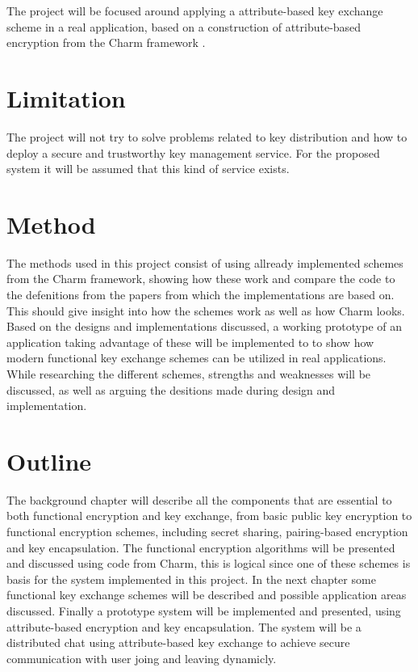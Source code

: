 The project will be focused around applying a attribute-based key exchange scheme in a real application, based on a construction of attribute-based encryption from the Charm framework \cite{DBLP:Charm13}.


\section{Limitation}\label{sec:limitations}
The project will not try to solve problems related to key distribution and how to deploy a secure and trustworthy key management service. For the proposed system it will be assumed that this kind of service exists.

\section{Method}
The methods used in this project consist of using allready implemented schemes from the Charm framework, showing how these work and compare the code to the defenitions from the papers from which the implementations are based on. This should give insight into how the schemes work as well as how Charm looks. Based on the designs and implementations discussed, a working prototype of an application taking advantage of these will be implemented to to show how modern functional key exchange schemes can be utilized in real applications. While researching the different schemes, strengths and weaknesses will be discussed, as well as arguing the desitions made during design and implementation.


\section{Outline}\label{sec:outline}
The background chapter will describe all the components that are essential to both functional encryption and key exchange, from basic public key encryption to functional encryption schemes, including secret sharing, pairing-based encryption and key encapsulation. The functional encryption algorithms will be presented and discussed using code from Charm, this is logical since one of these schemes is basis for the system implemented in this project. In the next chapter some functional key exchange schemes will be described and possible application areas discussed. Finally a prototype system will be implemented and presented, using attribute-based encryption and key encapsulation. The system will be a distributed chat using attribute-based key exchange to achieve secure communication with user joing and leaving dynamicly.
